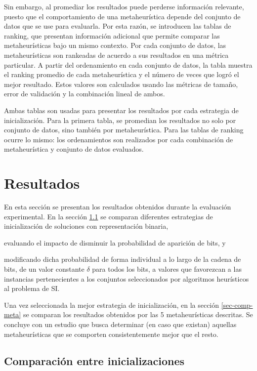 Sin embargo, al promediar los resultados puede perderse información relevante, puesto que el comportamiento de una metaheurística depende del conjunto de datos que se use para evaluarla. Por esta razón, se introducen las tablas de ranking, que presentan información adicional que permite comparar las metaheurísticas bajo un mismo contexto. Por cada conjunto de datos, las metaheurísticas son rankeadas de acuerdo a sus resultados en una métrica particular. A partir del ordenamiento en cada conjunto de datos, la tabla muestra el ranking promedio de cada metaheurística y el número de veces que logró el mejor resultado. Estos valores son calculados usando las métricas de tamaño, error de validación y la combinación lineal de ambos.

Ambas tablas son usadas para presentar los resultados por cada estrategia de inicialización. Para la primera tabla, se promedian los resultados no solo por conjunto de datos, sino también por metaheurística. Para las tablas de ranking ocurre lo mismo: los ordenamientos son realizados por cada combinación de metaheurística y conjunto de datos evaluados.

\section{Resultados}
\label{sec-res}

En esta sección se presentan los resultados obtenidos durante la evaluación experimental. En la sección \ref{sec-comp-inits} se comparan diferentes estrategias de inicialización de soluciones con representación binaria,
\begin{inparaenum}
\item evaluando el impacto de disminuir la probabilidad de aparición de bits, y
\item modificando dicha probabilidad de forma individual a lo largo de la cadena de bits, de un valor constante $\delta$ para todos los bits, a valores que favorezcan a las instancias pertenecientes a los conjuntos seleccionados por algoritmos heurísticos al problema de SI.
\end{inparaenum}
Una vez seleccionada la mejor estrategia de inicialización, en la sección \ref{sec-comp-meta} se comparan los resultados obtenidos por las 5 metaheurísticas descritas. Se concluye con un estudio que busca determinar (en caso que existan) aquellas metaheurísticas que se comporten consistentemente mejor que el resto.

\subsection{Comparación entre inicializaciones}
\label{sec-comp-inits}

